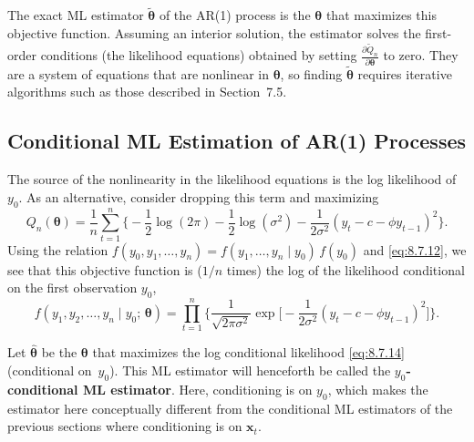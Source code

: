 The exact ML estimator $\tilde{\boldsymbol{\theta}}$ of the AR(1) process is the $\boldsymbol{\theta}$ that maximizes this objective function. Assuming an interior solution, the estimator solves the first-order
conditions (the likelihood equations) obtained by setting $\frac{\partial \tilde{Q}_n}{\partial \boldsymbol{\theta}}$
to zero. They are a
system of equations that are nonlinear in $\boldsymbol{\theta}$, so finding $\tilde{\boldsymbol{\theta}}$ requires iterative algorithms such as those described in Section~7.5.

\subsection*{Conditional ML Estimation of AR(1) Processes}

The source of the nonlinearity in the likelihood equations is the log likelihood of
$y_0$. As an alternative, consider dropping this term and maximizing
\begin{equation}
  Q_n(\boldsymbol{\theta})
  = \frac{1}{n}\sum_{t=1}^{n}
    \biggl\{-\frac{1}{2}\log(2\pi) - \frac{1}{2}\log(\sigma^2)
    - \frac{1}{2\sigma^2}(y_t - c - \phi y_{t-1})^2\biggr\}.
  \label{eq:8.7.14} \tag{8.7.14}
\end{equation}
Using the relation $f(y_0, y_1, \ldots, y_n) = f(y_1, \ldots, y_n \mid y_0)\,f(y_0)$ and \eqref{eq:8.7.12}, we
see that this objective function is ($1/n$ times) the log of the likelihood conditional
on the first observation $y_0$,
\begin{equation}
  f(y_1, y_2, \ldots, y_n \mid y_0;\, \boldsymbol{\theta})
  = \prod_{t=1}^{n}\biggl\{
    \frac{1}{\sqrt{2\pi\sigma^2}}
    \exp\biggl[-\frac{1}{2\sigma^2}(y_t - c - \phi y_{t-1})^2\biggr]\biggr\}.
  \label{eq:8.7.15} \tag{8.7.15}
\end{equation}

Let $\hat{\boldsymbol{\theta}}$ be the $\boldsymbol{\theta}$ that maximizes the log conditional likelihood \eqref{eq:8.7.14} (conditional
on~$y_0$). This ML estimator will henceforth be called the \textbf{$y_0$-conditional ML estimator}. Here, conditioning is on $y_0$, which makes the estimator here conceptually
different from the conditional ML estimators of the previous sections where conditioning is on $\mathbf{x}_t$.

